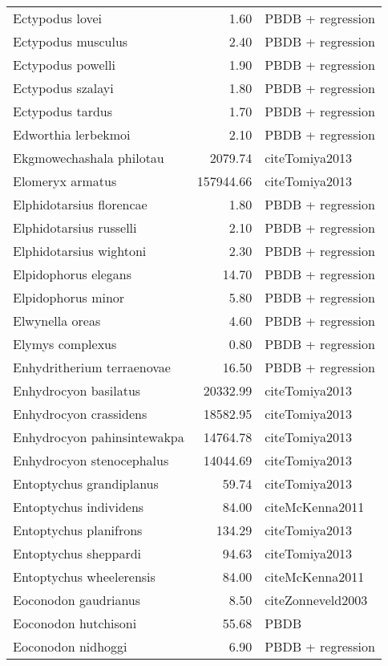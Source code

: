 \begin{table}[ht]
\begin{tabular}{lrl}
  Ectypodus lovei & 1.60 & PBDB + regression \\ 
  Ectypodus musculus & 2.40 & PBDB + regression \\ 
  Ectypodus powelli & 1.90 & PBDB + regression \\ 
  Ectypodus szalayi & 1.80 & PBDB + regression \\ 
  Ectypodus tardus & 1.70 & PBDB + regression \\ 
  Edworthia lerbekmoi & 2.10 & PBDB + regression \\ 
  Ekgmowechashala philotau & 2079.74 & cite{Tomiya2013} \\ 
  Elomeryx armatus & 157944.66 & cite{Tomiya2013} \\ 
  Elphidotarsius florencae & 1.80 & PBDB + regression \\ 
  Elphidotarsius russelli & 2.10 & PBDB + regression \\ 
  Elphidotarsius wightoni & 2.30 & PBDB + regression \\ 
  Elpidophorus elegans & 14.70 & PBDB + regression \\ 
  Elpidophorus minor & 5.80 & PBDB + regression \\ 
  Elwynella oreas & 4.60 & PBDB + regression \\ 
  Elymys complexus & 0.80 & PBDB + regression \\ 
  Enhydritherium terraenovae & 16.50 & PBDB + regression \\ 
  Enhydrocyon basilatus & 20332.99 & cite{Tomiya2013} \\ 
  Enhydrocyon crassidens & 18582.95 & cite{Tomiya2013} \\ 
  Enhydrocyon pahinsintewakpa & 14764.78 & cite{Tomiya2013} \\ 
  Enhydrocyon stenocephalus & 14044.69 & cite{Tomiya2013} \\ 
  Entoptychus grandiplanus & 59.74 & cite{Tomiya2013} \\ 
  Entoptychus individens & 84.00 & cite{McKenna2011} \\ 
  Entoptychus planifrons & 134.29 & cite{Tomiya2013} \\ 
  Entoptychus sheppardi & 94.63 & cite{Tomiya2013} \\ 
  Entoptychus wheelerensis & 84.00 & cite{McKenna2011} \\ 
  Eoconodon gaudrianus & 8.50 & cite{Zonneveld2003} \\ 
  Eoconodon hutchisoni & 55.68 & PBDB \\ 
  Eoconodon nidhoggi & 6.90 & PBDB + regression \\ 

\end{tabular}
\end{table}
